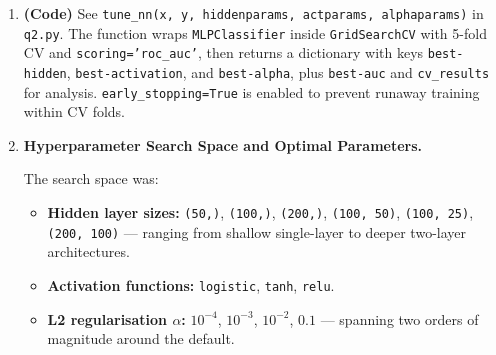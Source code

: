 \documentclass[a4paper,12pt]{article}
\begin{document}
\begin{enumerate}
\begin{enumerate}[label=(\alph*)]
\begin{enumerate}[label=\roman*.]
    \item \textbf{One-hot encoding} of \texttt{grade}, \texttt{home\_ownership},
    \texttt{verification\_status}, and \texttt{purpose} (with \texttt{drop\_first=True}
    to avoid dummy-variable collinearity).

    \item \textbf{Median imputation} for any remaining \texttt{NaN} values
    (129 missing entries total, all numerical).

    \item \textbf{Feature standardisation} (\texttt{StandardScaler}) — zero mean and unit
    variance scaling fitted on the training set only. This is \emph{critical} for neural
    networks: gradient descent converges far slower (or diverges) when features have
    vastly different scales. The scaler is applied to validation and test sets using the
    training statistics to prevent data leakage. The decision tree does not require
    scaling, so it is trained on the unscaled data.
\end{enumerate}

\item \textbf{(Code)} See \texttt{tune\_nn(x, y, hiddenparams, actparams, alphaparams)}
in \texttt{q2.py}. The function wraps \texttt{MLPClassifier} inside
\texttt{GridSearchCV} with 5-fold CV and \texttt{scoring='roc\_auc'}, then returns a
dictionary with keys \texttt{best-hidden}, \texttt{best-activation}, and
\texttt{best-alpha}, plus \texttt{best-auc} and \texttt{cv\_results} for analysis.
\texttt{early\_stopping=True} is enabled to prevent runaway training within CV folds.

\item \textbf{Hyperparameter Search Space and Optimal Parameters.}

The search space was:
\begin{itemize}
    \item \textbf{Hidden layer sizes:} \texttt{(50,)}, \texttt{(100,)}, \texttt{(200,)},
    \texttt{(100, 50)}, \texttt{(100, 25)}, \texttt{(200, 100)} — ranging from shallow
    single-layer to deeper two-layer architectures.
    \item \textbf{Activation functions:} \texttt{logistic}, \texttt{tanh}, \texttt{relu}.
    \item \textbf{L2 regularisation $\alpha$:} $10^{-4}$, $10^{-3}$, $10^{-2}$, $0.1$ —
    spanning two orders of magnitude around the default.
\end{itemize}


\end{enumerate}
\end{enumerate}
\end{document}
